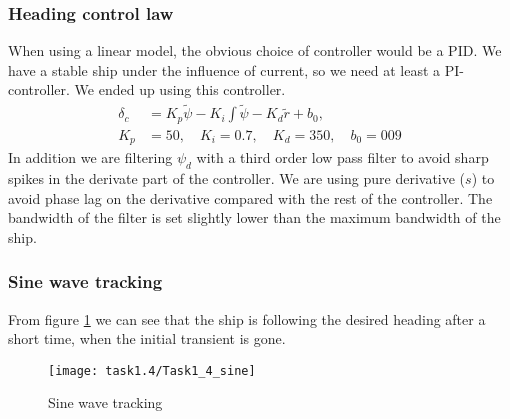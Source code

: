 \subsubsection*{Heading control law}
When using a linear model, the obvious choice of controller would be a PID. We have a stable ship under the influence of current, so we need at least a PI-controller. We ended up using this controller.
\begin{equation}
\begin{split}
    \delta_c &= K_p \tilde{\psi} - K_i \int \tilde{\psi} - K_d \tilde{r} + b_0,\\
    K_p &= 50,\quad K_i=0.7,\quad K_d=350,\quad b_0=009
\end{split}
\end{equation}
In addition we are filtering $\psi_d$ with a third order low pass filter to avoid sharp spikes in the derivate part of the controller. We are using pure derivative ($s$) to avoid phase lag on the derivative compared with the rest of the controller. The bandwidth of the filter is set slightly lower than the maximum bandwidth of the ship.

\subsubsection*{Sine wave tracking}
From figure \ref{fig:1.4-sine} we can see that the ship is following the desired heading after a short time, when the initial transient is gone. 
\begin{figure}[H]
    \centering
    \texttt{[image: task1.4/Task1\_4\_sine]}
    \caption{Sine wave tracking}
    \label{fig:1.4-sine}
\end{figure}